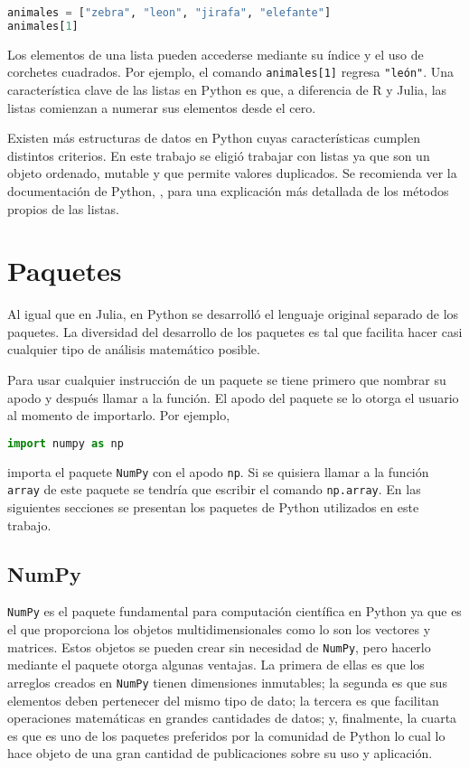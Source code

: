 \begin{lstlisting}[language=Python]
animales = ["zebra", "leon", "jirafa", "elefante"]
animales[1]
\end{lstlisting}

Los elementos de una lista pueden accederse mediante su índice y el uso de corchetes cuadrados. Por ejemplo, el comando \texttt{animales[1]} regresa \texttt{"león"}. Una característica clave de las listas en \textsf{Python} es que, a diferencia de \textsf{R} y \textsf{Julia}, las listas comienzan a numerar sus elementos desde el cero. 

Existen más estructuras de datos en \textsf{Python} cuyas características cumplen distintos criterios. En este trabajo se eligió trabajar con listas ya que son un objeto ordenado, mutable y que permite valores duplicados. Se recomienda ver la documentación de \textsf{Python}, \cite{doc_python}, para una explicación más detallada de los métodos propios de las listas. 

\section{Paquetes}
Al igual que en \textsf{Julia}, en \textsf{Python} se desarrolló el lenguaje original separado de los paquetes. La diversidad del desarrollo de los paquetes es tal que facilita hacer casi cualquier tipo de análisis matemático posible. 

Para usar cualquier instrucción de un paquete se tiene primero que nombrar su apodo y después llamar a la función. El apodo del paquete se lo otorga el usuario al momento de importarlo. Por ejemplo, 
\begin{lstlisting}[language=Python]
	import numpy as np
\end{lstlisting}

\noindent importa el paquete \texttt{NumPy} con el apodo \texttt{np}. Si se quisiera llamar a la función \texttt{array} de este paquete se tendría que escribir el comando \texttt{np.array}. En las siguientes secciones se presentan los paquetes de \textsf{Python} utilizados en este trabajo. 

\subsection{NumPy} \label{seccion_numpy}
\texttt{NumPy} es el paquete fundamental para computación científica en \textsf{Python} ya que es el que proporciona los objetos multidimensionales como lo son los vectores y matrices. Estos objetos se pueden crear sin necesidad de \texttt{NumPy}, pero hacerlo mediante el paquete otorga algunas ventajas. La primera de ellas es que los arreglos creados en \texttt{NumPy} tienen dimensiones inmutables; la segunda es que sus elementos deben pertenecer del mismo tipo de dato; la tercera es que facilitan operaciones matemáticas en grandes cantidades de datos; y, finalmente, la cuarta es que es uno de los paquetes preferidos por la comunidad de \textsf{Python} lo cual lo hace objeto de una gran cantidad de publicaciones sobre su uso y aplicación. 

